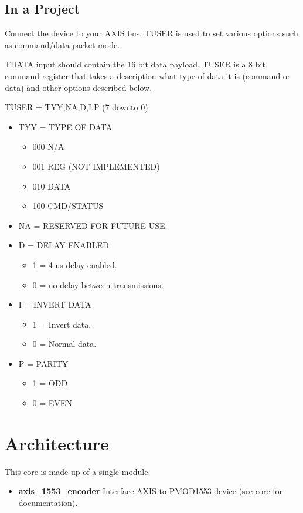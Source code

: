 

\subsection{In a Project}
\par
Connect the device to your AXIS bus. TUSER is used to set various options such as command/data packet mode.

\par
TDATA input should contain the 16 bit data payload. TUSER is a 8 bit command register
that takes a description what type of data it is (command or data) and other options
described below.

TUSER = {TYY,NA,D,I,P} (7 downto 0)
\begin{itemize}
\item TYY = TYPE OF DATA
  \begin{itemize}
    \item 000 N/A
    \item 001 REG (NOT IMPLEMENTED)
    \item 010 DATA
    \item 100 CMD/STATUS
  \end{itemize}
  \item NA = RESERVED FOR FUTURE USE.
  \item D = DELAY ENABLED
  \begin{itemize}
    \item 1 = 4 us delay enabled.
    \item 0 = no delay between transmissions.
  \end{itemize}
  \item I = INVERT DATA
  \begin{itemize}
    \item 1 = Invert data.
    \item 0 = Normal data.
  \end{itemize}
  \item P = PARITY
  \begin{itemize}
    \item 1 = ODD
    \item 0 = EVEN
  \end{itemize}
\end{itemize}

\section{Architecture}
\par
This core is made up of a single module.
\begin{itemize}
  \item \textbf{axis\_1553\_encoder} Interface AXIS to PMOD1553 device (see core for documentation).
\end{itemize}

